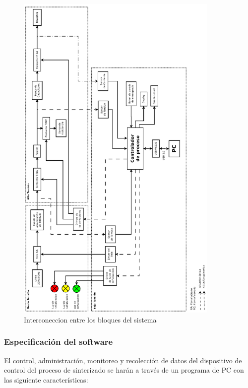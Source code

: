     \begin{figure}[h!]
    \centering
    \includegraphics[width=370px]{../../Documentacion/Diagramas/diagramaBloquesDetalle.png}
    \caption{Interconeccion entre los bloques del sistema}
    \end{figure}
  \newpage


  \subsubsection{Especificación del software }  
 El control, administración, monitoreo y recolección de datos del dispositivo de control del proceso de sinterizado se harán a través de 
    un programa de PC con las siguiente características:
    
